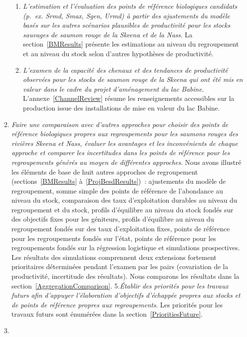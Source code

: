 \documentclass[french,11pt]{book}
\begin{document}
\begin{enumerate}
\begin{enumerate}
  \item
    \emph{L'estimation et l'évaluation des points de référence biologiques candidats (p.~ex. Srmd, Smax, Sgen, Urmd) à partir des ajustements du modèle basés sur les autres scénarios plausibles de productivité pour les stocks sauvages de saumon rouge de la Skeena et de la Nass}. La section~\ref{BMResults} présente les estimations au niveau du regroupement et au niveau du stock selon d'autres hypothèses de productivité.
  \item
    \emph{L'examen de la capacité des chenaux et des tendances de productivité observées pour les stocks de saumon rouge de la Skeena qui ont été mis en valeur dans le cadre du projet d'aménagement du lac Babine}. L'annexe~\ref{ChannelReview} résume les renseignements accessibles sur la production issue des installations de mise en valeur du lac Babine.
  \end{enumerate}
\item
  \emph{Faire une comparaison avec d'autres approches pour choisir des points de référence biologiques propres aux regroupements pour les saumons rouges des rivières Skeena et Nass, évaluer les avantages et les inconvénients de chaque approche et comparer les incertitudes dans les points de référence pour les regroupements générés au moyen de différentes approches}. Nous avons illustré les éléments de base de huit autres approches de regroupement (sections~\ref{BMResults} à~\ref{ProjBesdResults})~: ajustements du modèle de regroupement, somme simple des points de référence de l'abondance au niveau du stock, comparaison des taux d'exploitation durables au niveau du regroupement et du stock, profils d'équilibre au niveau du stock fondés sur des objectifs fixes pour les géniteurs, profils d'équilibre au niveau du regroupement fondés sur des taux d'exploitation fixes, points de référence pour les regroupements fondés sur l'état, points de référence pour les regroupements fondés sur la régression logistique et simulations prospectives. Les résultats des simulations comprennent deux extensions fortement prioritaires déterminées pendant l'examen par les pairs (covariation de la productivité, incertitude des résultats). Nous comparons les résultats dans la section~\ref{AggregationComparison}. 5.\emph{Établir des priorités pour les travaux futurs afin d'appuyer l'élaboration d'objectifs d'échappée propres aux stocks et de points de référence propres aux regroupements}. Les priorités pour les travaux futurs sont énumérées dans la section~\ref{PrioritiesFuture}.
\item

\end{enumerate}
\end{document}

